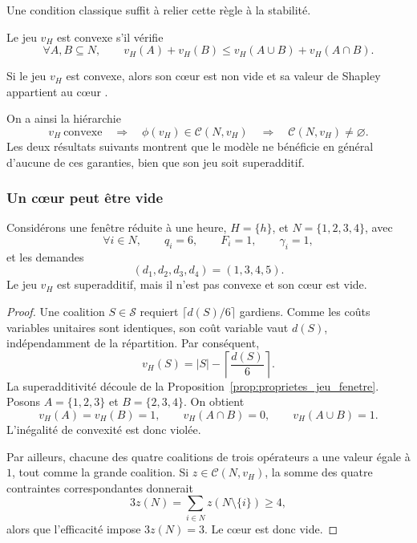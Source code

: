 Une condition classique suffit à relier cette règle à la stabilité.

\begin{definition}
Le jeu $v_H$ est convexe s'il vérifie
\[
\forall A,B\subseteq N,\qquad
v_H(A)+v_H(B)
\leqslant
v_H(A\cup B)+v_H(A\cap B).
\]
\end{definition}

\begin{proposition}
\label{prop:shapley_coeur_convexe}
Si le jeu $v_H$ est convexe, alors son cœur est non vide et sa valeur de
Shapley appartient au cœur \cite{shapley1971convex}.
\end{proposition}

On a ainsi la hiérarchie
\[
v_H\ \text{convexe}
\quad\Longrightarrow\quad
\phi(v_H)\in\mathcal C(N,v_H)
\quad\Longrightarrow\quad
\mathcal C(N,v_H)\neq\varnothing.
\]
Les deux résultats suivants montrent que le modèle ne bénéficie en général
d'aucune de ces garanties, bien que son jeu soit superadditif.

\subsubsection{Un cœur peut être vide}

\begin{proposition}
\label{prop:contre_exemple_coeur_vide}
Considérons une fenêtre réduite à une heure, \(H=\{h\}\), et
$N=\{1,2,3,4\}$, avec
\[
\forall i\in N,\qquad q_i=6,\qquad F_i=1,\qquad \gamma_i=1,
\]
et les demandes
\[
    (d_1,d_2,d_3,d_4)=(1,3,4,5).
\]
Le jeu $v_H$ est superadditif, mais il n'est pas convexe et son
cœur est vide.
\end{proposition}

\begin{proof}
Une coalition \(S\in\mathcal S\) requiert
\(\lceil d(S)/6\rceil\) gardiens. Comme les coûts variables unitaires sont
identiques, son coût variable vaut \(d(S)\), indépendamment de la répartition.
Par conséquent,
\[
    v_H(S)
    =|S|-\left\lceil\frac{d(S)}6\right\rceil.
\]
La superadditivité découle de la
Proposition~\ref{prop:proprietes_jeu_fenetre}. Posons
\(A=\{1,2,3\}\) et \(B=\{2,3,4\}\). On obtient
\[
v_H(A)=v_H(B)=1,
\qquad
v_H(A\cap B)=0,
\qquad
v_H(A\cup B)=1.
\]
L'inégalité de convexité est donc violée.

Par ailleurs, chacune des quatre coalitions de trois opérateurs a une valeur
égale à \(1\), tout comme la grande coalition. Si
\(z\in\mathcal C(N,v_H)\), la somme des quatre contraintes correspondantes
donnerait
\[
    3z(N)
    =
    \sum_{i\in N}z(N\setminus\{i\})
    \geqslant4,
\]
alors que l'efficacité impose \(3z(N)=3\). Le cœur est donc vide.
\end{proof}

